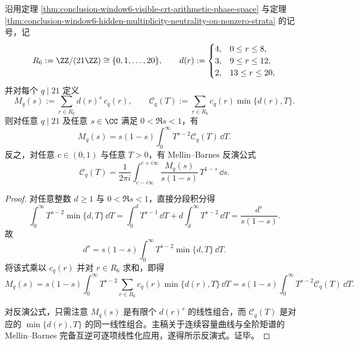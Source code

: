 \begin{theorem}\label{thm:conclusion-window6-output-ramanujan-mellin-duality}
沿用定理 \ref{thm:conclusion-window6-visible-crt-arithmetic-phase-space} 与定理 \ref{thm:conclusion-window6-hidden-multiplicity-neutrality-on-nonzero-strata} 的记号，记
\[
R_6:=\ZZ/(21\ZZ)\cong \{0,1,\dots,20\},
\qquad
d(r):=
\begin{cases}
4,& 0\le r\le 8,\\
3,& 9\le r\le 12,\\
2,& 13\le r\le 20,
\end{cases}
\]
并对每个 \(q\mid 21\) 定义
\[
M_q(s):=\sum_{r\in R_6}d(r)^s\,c_q(r),
\qquad
\mathcal C_q(T):=\sum_{r\in R_6}c_q(r)\min\{d(r),T\}.
\]
则对任意 \(q\mid 21\) 及任意 \(s\in\CC\) 满足 \(0<\Re s<1\)，有
\[
\boxed{\;
M_q(s)=s(1-s)\int_0^\infty T^{s-2}\mathcal C_q(T)\,\dd T.\;}
\]
反之，对任意 \(c\in(0,1)\) 与任意 \(T>0\)，有 Mellin--Barnes 反演公式
\[
\boxed{\;
\mathcal C_q(T)=\frac1{2\pi i}
\int_{c-i\infty}^{c+i\infty}
\frac{M_q(s)}{s(1-s)}\,T^{1-s}\,\dd s.\;}
\]
\end{theorem}
\begin{proof}
对任意整数 \(d\ge 1\) 与 \(0<\Re s<1\)，直接分段积分得
\[
\int_0^\infty T^{s-2}\min\{d,T\}\,\dd T
=
\int_0^d T^{s-1}\,\dd T+d\int_d^\infty T^{s-2}\,\dd T
=
\frac{d^s}{s(1-s)}.
\]
故
\[
d^s=s(1-s)\int_0^\infty T^{s-2}\min\{d,T\}\,\dd T.
\]
将该式乘以 \(c_q(r)\) 并对 \(r\in R_6\) 求和，即得
\[
M_q(s)
=
s(1-s)\int_0^\infty
T^{s-2}
\sum_{r\in R_6}c_q(r)\min\{d(r),T\}\,\dd T
=
s(1-s)\int_0^\infty T^{s-2}\mathcal C_q(T)\,\dd T.
\]

对反演公式，只需注意 \(M_q(s)\) 是有限个 \(d(r)^s\) 的线性组合，而 \(\mathcal C_q(T)\) 是对应的 \(\min\{d(r),T\}\) 的同一线性组合。主稿关于连续容量曲线与全阶矩谱的 Mellin--Barnes 完备互逆可逐项线性化应用，遂得所示反演式。证毕。
\end{proof}

